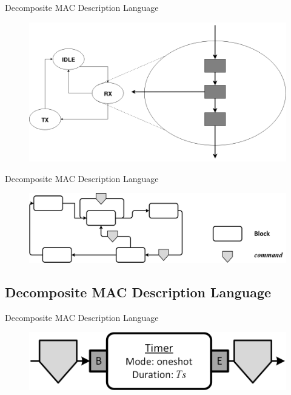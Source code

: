 \documentclass{beamer}
\begin{document}
\begin{frame}{Decomposite MAC Description Language}
	\begin{figure}
 		\includegraphics[width=\linewidth]{hfsm.png}
 		\label{fig:hfsm}
	\end{figure}
\end{frame}

\begin{frame}{Decomposite MAC Description Language}
	\begin{figure}
 		\includegraphics[width=\linewidth]{graph.png}
 		\label{fig:graph}
	\end{figure}
\end{frame}

\subsection{Decomposite MAC Description Language}
\begin{frame}{Decomposite MAC Description Language}
	\begin{figure}
 		\includegraphics[width=\linewidth]{simple_timer.png}
 		\label{fig:timer}
	\end{figure}
\end{frame}
\end{document}
